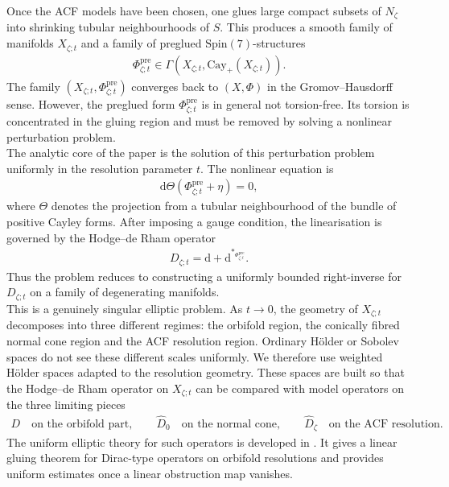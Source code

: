 \documentclass[psamsfonts]{amsart}
\theoremstyle{plain}
\theoremstyle{definition}{
\newtheorem{defi}{Definition}[section]
\newtheorem{ass}{Assumption}
\newtheorem*{nota}{Notation}}
\theoremstyle{remark}{
\newtheorem{rem}{Remark}
\newtheorem{ex}{Example}}
\theoremstyle{plain}{
\newtheorem{thm}{Theorem}[section]
\newtheorem{lem}{Lemma}[section]
\newtheorem{cor}{Corollary}[section]
\newtheorem{prop}{Proposition}[section]
\newtheorem{con}{Conjecture}[section]}
\newcommand{\m}[1]{{\mathrm{#1}}}
\begin{document}
Once the ACF models have been chosen, one glues large compact subsets of $N_\zeta$ into shrinking tubular neighbourhoods of $S$. This produces a smooth family of manifolds $X_{\zeta;t}$ and a family of preglued $\m{Spin}(7)$-structures
\begin{align*}
    \Phi^{\m{pre}}_{\zeta;t} \in \Gamma(X_{\zeta;t},\m{Cay}_+(X_{\zeta;t})).
\end{align*}
The family $(X_{\zeta;t},\Phi^{\m{pre}}_{\zeta;t})$ converges back to $(X,\Phi)$ in the Gromov--Hausdorff sense. However, the preglued form $\Phi^{\m{pre}}_{\zeta;t}$ is in general not torsion-free. Its torsion is concentrated in the gluing region and must be removed by solving a nonlinear perturbation problem.\\

The analytic core of the paper is the solution of this perturbation problem uniformly in the resolution parameter $t$. The nonlinear equation is
\begin{align*}
\m{d}\Theta(\Phi^{\m{pre}}_{\zeta;t}+\eta)=0,
\end{align*}
where $\Theta$ denotes the projection from a tubular neighbourhood of the bundle of positive Cayley forms. After imposing a gauge condition, the linearisation is governed by the Hodge--de Rham operator
\begin{align*}
D_{\zeta;t}=\m{d}+\m{d}^{*_{\Phi^{\m{pre}}_{\zeta;t}}}.
\end{align*}
Thus the problem reduces to constructing a uniformly bounded right-inverse for $D_{\zeta;t}$ on a family of degenerating manifolds.\\

This is a genuinely singular elliptic problem. As $t \to 0$, the geometry of $X_{\zeta;t}$ decomposes into three different regimes: the orbifold region, the conically fibred normal cone region and the ACF resolution region. Ordinary Hölder or Sobolev spaces do not see these different scales uniformly. We therefore use weighted Hölder spaces adapted to the resolution geometry. These spaces are built so that the Hodge--de Rham operator on $X_{\zeta;t}$ can be compared with model operators on the three limiting pieces
\begin{align*}
D \quad \text{on the orbifold part}, \qquad
\widehat D_0 \quad \text{on the normal cone}, \qquad
\widehat D_\zeta \quad \text{on the ACF resolution}.
\end{align*}
The uniform elliptic theory for such operators is developed in \cite{majewskiDirac}. It gives a linear gluing theorem for Dirac-type operators on orbifold resolutions and provides uniform estimates once a linear obstruction map vanishes.\\
\end{document}
